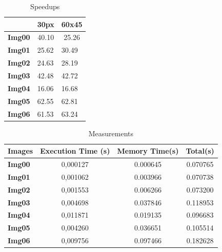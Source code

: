 \documentclass[a4paper]{article}
\begin{document}
\begin{table}[!ht]
\centering
\begin{tabular}{|l|l|l|}
\hline
\multicolumn{1}{|c|}{}               & \textbf{30px}              & \multicolumn{1}{c|}{\textbf{60x45}} \\ \hline
\multicolumn{1}{|c|}{\textbf{Img00}} & \multicolumn{1}{c|}{40.10} & \multicolumn{1}{c|}{25.26}          \\ \hline
\textbf{Img01}                       & 25.62                      & 30.49                               \\ \hline
\textbf{Img02}                       & 24.63                      & 28.19                               \\ \hline
\textbf{Img03}                       & 42.48                      & 42.72                               \\ \hline
\textbf{Img04}                       & 16.06                      & 16.68                               \\ \hline
\textbf{Img05}                       & 62.55                      & 62.81                               \\ \hline
\textbf{Img06}                       & 61.53                      & 63.24                               \\ \hline
\end{tabular}
\caption{Speedups}
\label{tab:histo_sp}
\end{table}
\FloatBarrier

\begin{table}[!ht]
\centering
\begin{tabular}{|l|c|c|c|}
\hline
\textbf{Images} & \textbf{Execution Time (s)} & \textbf{Memory Time(s)} & \textbf{Total(s)} \\ \hline
\textbf{Img00}  & 0,000127                    & 0.000645                & 0.070765          \\ \hline
\textbf{Img01}  & 0,001062                    & 0.003966                & 0.070738          \\ \hline
\textbf{Img02}  & 0,001553                    & 0.006266                & 0.073200          \\ \hline
\textbf{Img03}  & 0,004698                    & 0.037846                & 0.118953          \\ \hline
\textbf{Img04}  & 0,011871                    & 0.019135                & 0.096683          \\ \hline
\textbf{Img05}  & 0,004260                    & 0.036651                & 0.105514          \\ \hline
\textbf{Img06}  & 0,009756                    & 0.097466                & 0.182628          \\ \hline
\end{tabular}
\caption{Measurements}
\label{tab:histo_me}
\end{table}
\FloatBarrier
\end{document}
